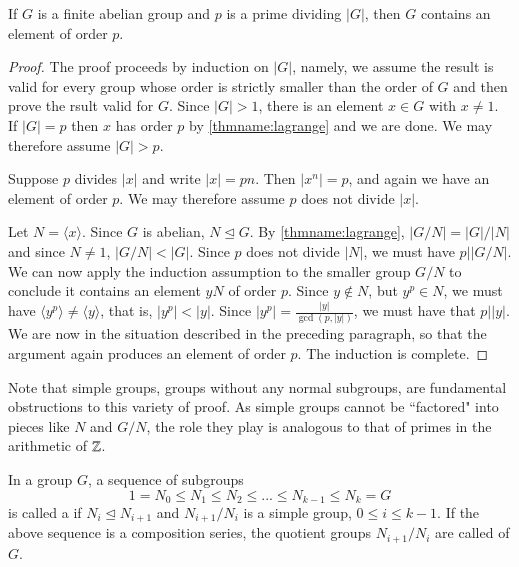 \documentclass[12pt, a4paper, oneside, openright, titlepage]{book}
\begin{document}
\begin{prop}
    If $G$ is a finite abelian group and $p$ is a prime dividing $|G|$, then $G$ contains an element of order $p$.
\end{prop}
\begin{proof}
    The proof proceeds by induction on $|G|$, namely, we assume the result is valid for every group whose order is strictly smaller than the order of $G$ and then prove the rsult valid for $G$. Since $|G| > 1$, there is an element $x \in G$ with $x \neq 1$. If $|G| = p$ then $x$ has order $p$ by \ref{thmname:lagrange} and we are done. We may therefore assume $|G| > p$.

    Suppose $p$ divides $|x|$ and write $|x| = pn$. Then $|x^n| = p$, and again we have an element of order $p$. We may therefore assume $p$ does not divide $|x|$.

    Let $N = \langle x\rangle$. Since $G$ is abelian, $N \trianglelefteq G$. By \ref{thmname:lagrange}, $|G/N| = |G|/|N|$ and since $N \neq 1$, $|G/N| < |G|$. Since $p$ does not divide $|N|$, we must have $p\vert |G/N|$. We can now apply the induction assumption to the smaller group $G/N$ to conclude it contains an element $yN$ of order $p$. Since $y \notin N$, but $y^p \in N$, we must have $\langle y^p\rangle \neq \langle y\rangle$, that is, $|y^p| < |y|$. Since $|y^p| = \frac{|y|}{\gcd(p,|y|)}$, we must have that $p\vert |y|$. We are now in the situation described in the preceding paragraph, so that the argument again produces an element of order $p$. The induction is complete.
\end{proof}

Note that simple groups, groups without any normal subgroups, are fundamental obstructions to this variety of proof. As simple groups cannot be ``factored" into pieces like $N$ and $G/N$, the role they play is analogous to that of primes in the arithmetic of $\mathbb Z$. 

\begin{defn}
    In a group $G$, a sequence of subgroups \begin{equation*}
        1 = N_0 \leq N_1 \leq N_2 \leq ... \leq N_{k-1} \leq N_k = G
    \end{equation*}
    is called a  if $N_i \trianglelefteq N_{i+1}$ and $N_{i+1}/N_i$ is a simple group, $0 \leq i \leq k-1$. If the above sequence is a composition series, the quotient groups $N_{i+1}/N_i$ are called  of $G$.
\end{defn}
\end{document}
